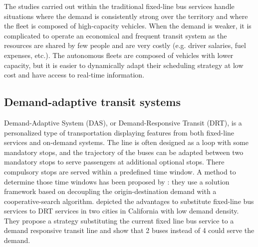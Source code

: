 \documentclass[12pt,a4paper]{article}
\begin{document}
The studies carried out within the traditional fixed-line bus services handle situations where the demand is consistently strong over the territory and where the fleet is composed of high-capacity vehicles. When the demand is weaker, it is complicated to operate an economical and frequent transit system as the resources are shared by few people and are very costly (e.g. driver salaries, fuel expenses, etc.). The autonomous fleets are composed of vehicles with lower capacity, but it is easier to dynamically adapt their scheduling strategy at low cost and have access to real-time information.

\subsection{Demand-adaptive transit systems}\label{das}
Demand-Adaptive System (DAS), or Demand-Responsive Transit (DRT), is a personalized type of transportation displaying features from both fixed-line services and on-demand systems. The line is often designed as a loop with some mandatory stops, and the trajectory of the buses can be adapted between two mandatory stops to serve passengers at additional optional stops. There compulsory stops are served within a predefined time window. A method to determine those time windows has been proposed by \cite{masterschedule}: they use a  solution framework based on decoupling the origin-destination demand with a cooperative-search algorithm. \cite{dasdesign} depicted the advantages to substitute fixed-line bus services to DRT services in two cities in California with low demand density. They propose a strategy substituting the current fixed line bus service to a demand responsive transit line and show that 2 buses instead of 4 could serve the demand. 
\end{document}
